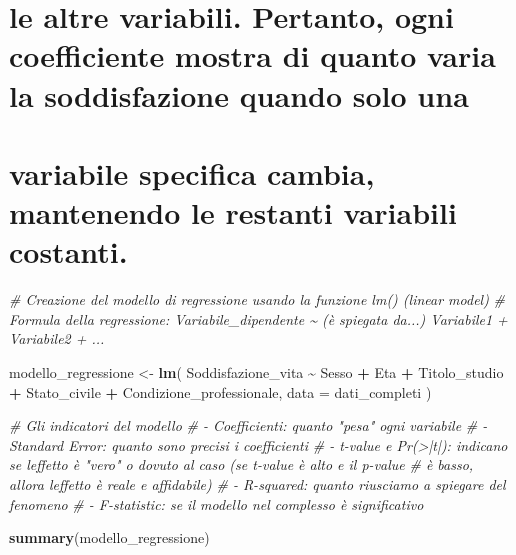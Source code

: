 \documentclass[
]{article}
\newenvironment{Shaded}{\begin{snugshade}}{\end{snugshade}}
\newcommand{\AttributeTok}[1]{\textcolor[rgb]{0.13,0.29,0.53}{#1}}
\newcommand{\CommentTok}[1]{\textcolor[rgb]{0.56,0.35,0.01}{\textit{#1}}}
\newcommand{\FunctionTok}[1]{\textcolor[rgb]{0.13,0.29,0.53}{\textbf{#1}}}
\newcommand{\NormalTok}[1]{#1}
\newcommand{\OtherTok}[1]{\textcolor[rgb]{0.56,0.35,0.01}{#1}}
\newcommand{\SpecialCharTok}[1]{\textcolor[rgb]{0.81,0.36,0.00}{\textbf{#1}}}
\begin{document}
\section{le altre variabili. Pertanto, ogni coefficiente mostra di
quanto varia la soddisfazione quando solo
una}\label{le-altre-variabili.-pertanto-ogni-coefficiente-mostra-di-quanto-varia-la-soddisfazione-quando-solo-una}

\section{variabile specifica cambia, mantenendo le restanti variabili
costanti.}\label{variabile-specifica-cambia-mantenendo-le-restanti-variabili-costanti.}

\begin{Shaded}
\begin{Highlighting}[]
\CommentTok{\# Creazione del modello di regressione usando la funzione lm() (linear model)}
\CommentTok{\# Formula della regressione: Variabile\_dipendente \textasciitilde{} (è spiegata da...) Variabile1 + Variabile2 + ...}

\NormalTok{modello\_regressione }\OtherTok{\textless{}{-}} \FunctionTok{lm}\NormalTok{(}
\NormalTok{  Soddisfazione\_vita }\SpecialCharTok{\textasciitilde{}}\NormalTok{ Sesso }\SpecialCharTok{+}\NormalTok{ Eta }\SpecialCharTok{+}\NormalTok{ Titolo\_studio }\SpecialCharTok{+} 
\NormalTok{                       Stato\_civile }\SpecialCharTok{+}\NormalTok{ Condizione\_professionale, }
  \AttributeTok{data =}\NormalTok{ dati\_completi}
\NormalTok{)}


\CommentTok{\# Gli indicatori del modello}
\CommentTok{\# {-} Coefficienti: quanto "pesa" ogni variabile}
\CommentTok{\# {-} Standard Error: quanto sono precisi i coefficienti  }
\CommentTok{\# {-} t{-}value e Pr(\textgreater{}|t|): indicano se l\textquotesingle{}effetto è "vero" o dovuto al caso (se t{-}value è alto e il p{-}value}
\CommentTok{\#   è basso, allora l\textquotesingle{}effetto è reale e affidabile) }
\CommentTok{\# {-} R{-}squared: quanto riusciamo a spiegare del fenomeno }
\CommentTok{\# {-} F{-}statistic: se il modello nel complesso è significativo}

\FunctionTok{summary}\NormalTok{(modello\_regressione)}
\end{Highlighting}
\end{Shaded}
\end{document}
